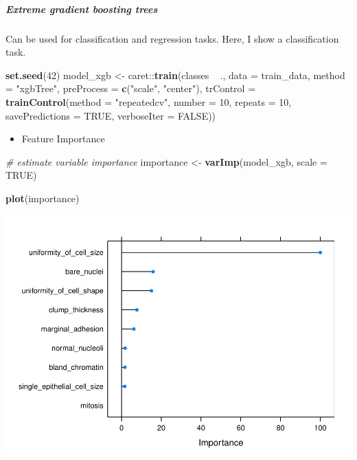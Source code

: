 \documentclass[]{article}
\newenvironment{Shaded}{\begin{snugshade}}{\end{snugshade}}
\newcommand{\KeywordTok}[1]{\textcolor[rgb]{0.13,0.29,0.53}{\textbf{{#1}}}}
\newcommand{\DataTypeTok}[1]{\textcolor[rgb]{0.13,0.29,0.53}{{#1}}}
\newcommand{\DecValTok}[1]{\textcolor[rgb]{0.00,0.00,0.81}{{#1}}}
\newcommand{\StringTok}[1]{\textcolor[rgb]{0.31,0.60,0.02}{{#1}}}
\newcommand{\CommentTok}[1]{\textcolor[rgb]{0.56,0.35,0.01}{\textit{{#1}}}}
\newcommand{\OtherTok}[1]{\textcolor[rgb]{0.56,0.35,0.01}{{#1}}}
\newcommand{\NormalTok}[1]{{#1}}
\providecommand{\tightlist}{%
  \setlength{\itemsep}{0pt}\setlength{\parskip}{0pt}}
\let\oldsubparagraph\subparagraph
\renewcommand{\subparagraph}[1]{\oldsubparagraph{#1}\mbox{}}
\begin{document}
\subparagraph{Extreme gradient boosting
trees}\label{extreme-gradient-boosting-trees}

Can be used for classification and regression tasks. Here, I show a
classification task.

\begin{Shaded}
\begin{Highlighting}[]
\KeywordTok{set.seed}\NormalTok{(}\DecValTok{42}\NormalTok{)}
\NormalTok{model_xgb <-}\StringTok{ }\NormalTok{caret::}\KeywordTok{train}\NormalTok{(classes ~}\StringTok{ }\NormalTok{.,}
                          \DataTypeTok{data =} \NormalTok{train_data,}
                          \DataTypeTok{method =} \StringTok{"xgbTree"}\NormalTok{,}
                          \DataTypeTok{preProcess =} \KeywordTok{c}\NormalTok{(}\StringTok{"scale"}\NormalTok{, }\StringTok{"center"}\NormalTok{),}
                          \DataTypeTok{trControl =} \KeywordTok{trainControl}\NormalTok{(}\DataTypeTok{method =} \StringTok{"repeatedcv"}\NormalTok{, }
                                                  \DataTypeTok{number =} \DecValTok{10}\NormalTok{, }
                                                  \DataTypeTok{repeats =} \DecValTok{10}\NormalTok{, }
                                                  \DataTypeTok{savePredictions =} \OtherTok{TRUE}\NormalTok{, }
                                                  \DataTypeTok{verboseIter =} \OtherTok{FALSE}\NormalTok{))}
\end{Highlighting}
\end{Shaded}

\begin{itemize}
\tightlist
\item
  Feature Importance
\end{itemize}

\begin{Shaded}
\begin{Highlighting}[]
\CommentTok{# estimate variable importance}
\NormalTok{importance <-}\StringTok{ }\KeywordTok{varImp}\NormalTok{(model_xgb, }\DataTypeTok{scale =} \OtherTok{TRUE}\NormalTok{)}

\KeywordTok{plot}\NormalTok{(importance)}
\end{Highlighting}
\end{Shaded}

\includegraphics{webinar_code_files/figure-latex/unnamed-chunk-16-1.pdf}
\end{document}
